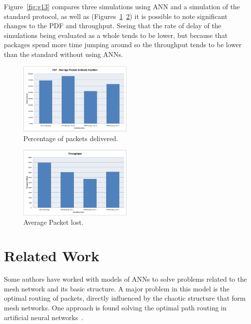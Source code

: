 \documentclass[10pt, conference, compsocconf]{IEEEtran}
\begin{document}
Figure~\ref{fig:g13} compares three simulations using ANN and a simulation of the standard protocol, as well as (Figures~\ref{fig:g14}~\ref{fig:g15}) it is possible to note significant changes to the PDF and throughput. Seeing that the rate of delay of the simulations being evaluated as a whole tends to be lower, but because that packages spend more time jumping around so the throughput tends to be lower than the standard without using ANNs.

\begin{figure}[h]
	\centering
	\includegraphics[width=0.5\textwidth]{./graphics/image014.png}
    \caption{ Percentage of packets delivered.}
    \label{fig:g14}
\end{figure}

\begin{figure}[h]
	\centering
	\includegraphics[width=0.5\textwidth]{./graphics/image015.png}
    \caption{ Average Packet lost.}
    \label{fig:g15}
\end{figure}



\section{Related Work}

Some authors have worked with models of ANNs to solve problems related to the mesh network and its basic structure. A major problem in this model is the optimal routing of packets, directly influenced by the chaotic structure that form mesh networks. One approach is found solving the optimal path routing in artificial neural networks~\cite{Venkataram:2002:NNB:638963.638974}.
\end{document}
